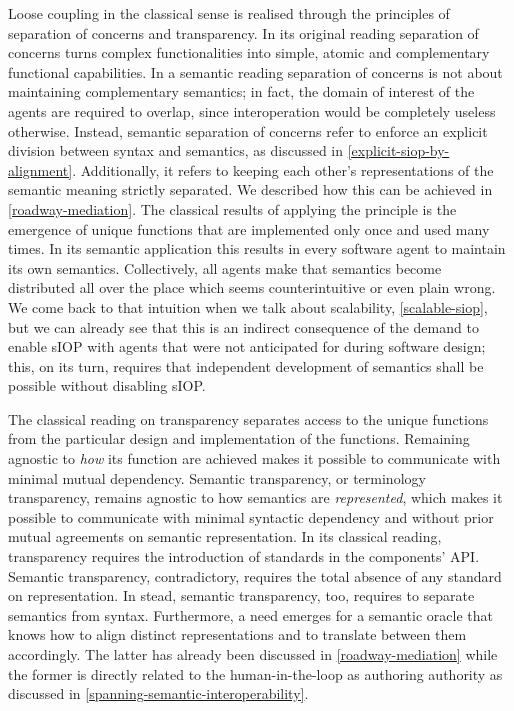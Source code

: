 \documentclass[sort&compress,preprint,authoryear,3p,twocolumn]{elsarticle}
\begin{document}
Loose coupling in the classical sense is realised through the principles
of separation of concerns and transparency. In its original reading
separation of concerns turns complex functionalities into simple, atomic
and complementary functional capabilities. In a semantic reading
separation of concerns is not about maintaining complementary semantics;
in fact, the domain of interest of the agents are required to overlap,
since interoperation would be completely useless otherwise. Instead,
semantic separation of concerns refer to enforce an explicit division
between syntax and semantics, as discussed in
\cref{explicit-siop-by-alignment}. Additionally, it refers to keeping
each other's representations of the semantic meaning strictly separated.
We described how this can be achieved in \cref{roadway-mediation}. The
classical results of applying the principle is the emergence of unique
functions that are implemented only once and used many times. In its
semantic application this results in every software agent to maintain
its own semantics. Collectively, all agents make that semantics become
distributed all over the place which seems counterintuitive or even
plain wrong. We come back to that intuition when we talk about
scalability, \cref{scalable-siop}, but we can already see that this is
an indirect consequence of the demand to enable sIOP with agents that
were not anticipated for during software design; this, on its turn,
requires that independent development of semantics shall be possible
without disabling sIOP.

The classical reading on transparency separates access to the unique
functions from the particular design and implementation of the
functions. Remaining agnostic to \emph{how} its function are achieved
makes it possible to communicate with minimal mutual dependency.
Semantic transparency, or terminology transparency, remains agnostic to
how semantics are \emph{represented}, which makes it possible to
communicate with minimal syntactic dependency and without prior mutual
agreements on semantic representation. In its classical reading,
transparency requires the introduction of standards in the components'
API. Semantic transparency, contradictory, requires the total absence of
any standard on representation. In stead, semantic transparency, too,
requires to separate semantics from syntax. Furthermore, a need emerges
for a semantic oracle that knows how to align distinct representations
and to translate between them accordingly. The latter has already been
discussed in \cref{roadway-mediation} while the former is directly
related to the human-in-the-loop as authoring authority as discussed in
\cref{spanning-semantic-interoperability}.
\end{document}
